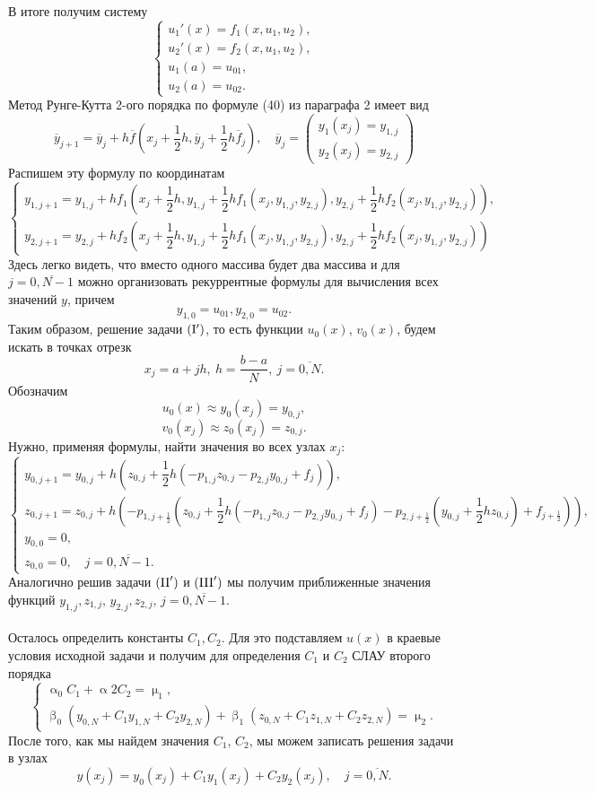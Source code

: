 \documentclass[a4paper, 12pt]{report}
\renewcommand{\alpha}{\upalpha}
\renewcommand{\beta}{\upbeta}
\renewcommand{\mu}{\upmu}
\begin{document}
	 В итоге получим систему 
	 $$
	 \begin{cases}
	 	u_1'(x) = f_1(x, u_1, u_2),\\
	 	u_2'(x) = f_2(x, u_1, u_2),\\
	 	u_1(a) = u_{01},\\
	 	u_2(a) = u_{02}.
	 \end{cases}
	 $$
	 Метод Рунге-Кутта 2-ого порядка по формуле (40) из параграфа 2 имеет вид 
	 $$\overline y_{j+1} = \overline y_j + h\overline f\left(x_j + \dfrac 12 h , \overline y_j + \dfrac 12 h \overline f_j\right),\quad \overline y_j = \begin{pmatrix}
	 	y_1(x_j) = y_{1,j}\\
	 	y_2(x_j) = y_{2,j}
	 \end{pmatrix}$$
	 Распишем эту формулу по координатам
	 $$\begin{cases}
	 	y_{1, j+1} = y_{1,j} + hf_1\left(x_j + \dfrac 12 h, y_{1,j} + \dfrac 12 hf_1(x_j, y_{1,j}, y_{2,j}), y_{2,j} + \dfrac12 h f_2(x_j, y_{1,j}, y_{2,j})\right),\\
	 	y_{2, j+1} = y_{2,j} + hf_2\left(x_j + \dfrac 12 h, y_{1,j} + \dfrac 12 hf_1(x_j, y_{1,j}, y_{2,j}), y_{2,j} + \dfrac12 h f_2(x_j, y_{1,j}, y_{2,j})\right)
	 \end{cases}$$
	 Здесь легко видеть, что вместо одного массива будет два массива и для $j = \overline{0, N-1}$ можно организовать рекуррентные формулы для вычисления всех значений $y$, причем
	 $$y_{1,0} = u_{01}, y_{2,0} = u_{02}.$$
	 Таким образом, решение задачи $(\rm{I}')$, то есть функции $u_0(x)$, $v_0(x)$, будем искать в точках отрезк $$x_j = a+jh,\ h = \dfrac{b-a}{N},\ j = \overline{0,N}.$$
	 Обозначим 
	 $$u_0(x) \approx y_0(x_j) = y_{0,j},$$
	 $$v_0(x_j) \approx z_0(x_j) = z_{0,j}.$$
	 Нужно, применяя формулы, найти значения во всех узлах $x_j$:
	 $$\begin{cases}
	 	y_{0, j+1} = y_{0,j} + h\left(z_{0,j} + \dfrac12 h(-p_{1,j} z_{0,j} - p_{2,j}y_{0,j} + f_j)\right),\\
	 	z_{0,j+1} = z_{0,j} + h\left( -p_{1, j+\frac12}(z_{0,j} + \dfrac 12 h (-p_{1,j} z_{0,j} - p_{2,j} y_{0,j} + f_j) - p_{2, j+\frac12} (y_{0,j} + \dfrac12 hz_{0,j}) + f_{j+\frac12})\right),\\
	 	y_{0,0} = 0,\\
	 	z_{0,0} = 0,\quad j = \overline{0,N-1}.
	 \end{cases}$$
	 Аналогично решив задачи $(\rm{II}')$ и $(\rm{III}')$ мы получим приближенные значения функций $y_{1,j}, z_{1,j}$, $y_{2,j}, z_{2,j}$, $j = \overline{0,N-1}$.\\\\
	 Осталось определить константы $C_1, C_2$. Для это подставляем $u(x)$ в краевые условия исходной задачи и получим для определения $C_1$ и $C_2$ СЛАУ второго порядка
	 $$
	 \begin{cases}
	 	\alpha_0 C_1 + \alpha 2 C_2 = \mu _1,\\
	 	\beta_0 (y_{0,N} + C_1y_{1, N} + C_2 y_{2,N}) + \beta_1 (z_{0,N} + C_1z_{1, N} + C_2 z_{2,N}) = \mu_2.
	 \end{cases}
	 $$
	 После того, как мы найдем значения $C_1$, $C_2$, мы можем записать решения задачи в узлах $$y(x_j) = y_0(x_j) + C_1y_1(x_j) + C_2 y_2(x_j),\quad j=\overline{0, N}.$$
	
\end{document}
